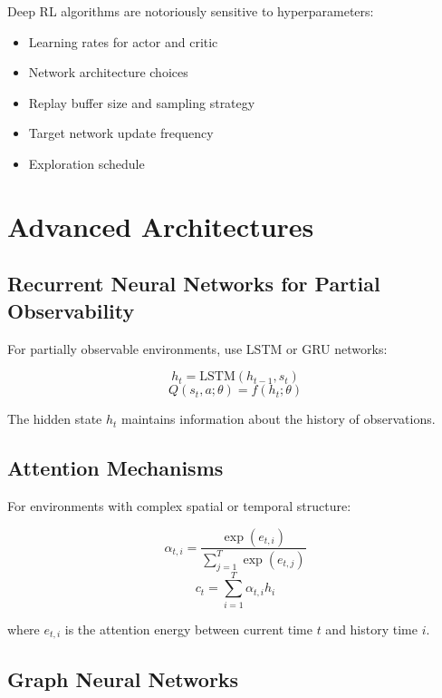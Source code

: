 Deep RL algorithms are notoriously sensitive to hyperparameters:

\begin{itemize}
\item Learning rates for actor and critic
\item Network architecture choices
\item Replay buffer size and sampling strategy
\item Target network update frequency
\item Exploration schedule
\end{itemize}

\section{Advanced Architectures}

\subsection{Recurrent Neural Networks for Partial Observability}

For partially observable environments, use LSTM or GRU networks:

\begin{equation}
h_t = \text{LSTM}(h_{t-1}, s_t)
\end{equation}
\begin{equation}
Q(s_t, a; \theta) = f(h_t; \theta)
\end{equation}

The hidden state $h_t$ maintains information about the history of observations.

\subsection{Attention Mechanisms}

For environments with complex spatial or temporal structure:

\begin{equation}
\alpha_{t,i} = \frac{\exp(e_{t,i})}{\sum_{j=1}^T \exp(e_{t,j})}
\end{equation}
\begin{equation}
c_t = \sum_{i=1}^T \alpha_{t,i} h_i
\end{equation}

where $e_{t,i}$ is the attention energy between current time $t$ and history time $i$.

\subsection{Graph Neural Networks}

